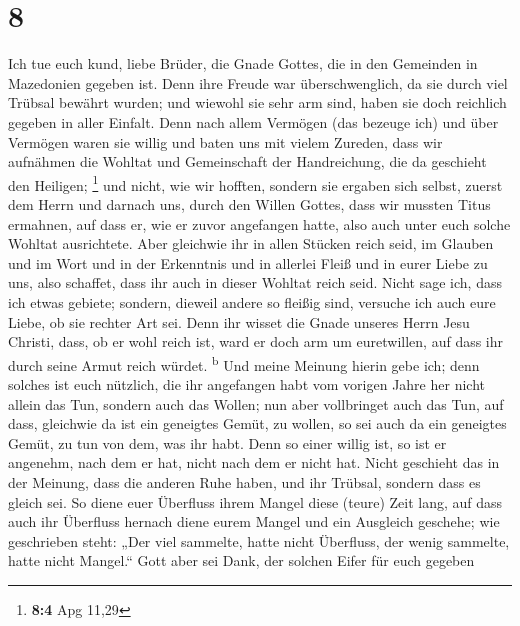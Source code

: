 \hypertarget{section-7}{%
\section{8}\label{section-7}}

 Ich tue euch kund, liebe Brüder, die Gnade Gottes, die in
den Gemeinden in Mazedonien gegeben ist.  Denn ihre Freude
war überschwenglich, da sie durch viel Trübsal bewährt wurden; und
wiewohl sie sehr arm sind, haben sie doch reichlich gegeben in aller
Einfalt.  Denn nach allem Vermögen (das bezeuge ich) und
über Vermögen waren sie willig  und baten uns mit vielem
Zureden, dass wir aufnähmen die Wohltat und Gemeinschaft der
Handreichung, die da geschieht den Heiligen; \footnote{\textbf{8:4} Apg
  11,29}  und nicht, wie wir hofften, sondern sie ergaben
sich selbst, zuerst dem Herrn und darnach uns, durch den Willen Gottes,
 dass wir mussten Titus ermahnen, auf dass er, wie er
zuvor angefangen hatte, also auch unter euch solche Wohltat ausrichtete.
 Aber gleichwie ihr in allen Stücken reich seid, im
Glauben und im Wort und in der Erkenntnis und in allerlei Fleiß und in
eurer Liebe zu uns, also schaffet, dass ihr auch in dieser Wohltat reich
seid.  Nicht sage ich, dass ich etwas gebiete; sondern,
dieweil andere so fleißig sind, versuche ich auch eure Liebe, ob sie
rechter Art sei.  Denn ihr wisset die Gnade unseres Herrn
Jesu Christi, dass, ob er wohl reich ist, ward er doch arm um
euretwillen, auf dass ihr durch seine Armut reich würdet.
\textsuperscript{b}  Und meine Meinung hierin gebe ich;
denn solches ist euch nützlich, die ihr angefangen habt vom vorigen
Jahre her nicht allein das Tun, sondern auch das Wollen; 
nun aber vollbringet auch das Tun, auf dass, gleichwie da ist ein
geneigtes Gemüt, zu wollen, so sei auch da ein geneigtes Gemüt, zu tun
von dem, was ihr habt.  Denn so einer willig ist, so ist
er angenehm, nach dem er hat, nicht nach dem er nicht hat.
 Nicht geschieht das in der Meinung, dass die anderen
Ruhe haben, und ihr Trübsal, sondern dass es gleich sei. 
So diene euer Überfluss ihrem Mangel diese (teure) Zeit lang, auf dass
auch ihr Überfluss hernach diene eurem Mangel und ein Ausgleich
geschehe;  wie geschrieben steht: „Der viel sammelte,
hatte nicht Überfluss, der wenig sammelte, hatte nicht Mangel.``
 Gott aber sei Dank, der solchen Eifer für euch gegeben
